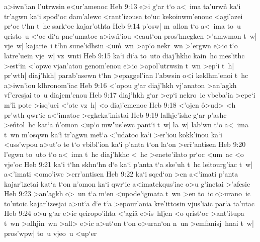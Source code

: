 a>iwn'ian
l'utrwsin
e<ur'amenoc\bibvsend
\vs Heb 9:13
e>i
g`ar
t`o
a<~ima
ta'urwn\r{}
ka`i
tr'agwn
ka`i
spod`oc
dam'alewc
<rant'izousa
to`uc
kekoinwm'enouc
<agi'azei
pr`oc
t`hn
t~hc
sark`oc
kajar'othta\bibvsend
\vs Heb 9:14
p'osw|
m~allon
t`o
a<~ima
to~u
qristo~u
<`oc
di`a
pne'umatoc
a>iw\r{n}'iou
<eaut`on
pros'hnegken
>'amwmon
t~w|
vje~w|
kajarie~i
t`hn
sune'idhsin
<u\r{m}~wn
>ap`o
nekr~wn
>'ergwn
e>ic
t`o
latre'uein
vje~w|
vz~wnti\bibvsend
\vs Heb 9:15
ka`i
di`a
to~uto
diaj'hkhc
kain~hc
mes'ithc
>est`in
<'opwc
vjan'atou
genom'enou
e>ic
>apol'utrwsin
t~wn
>ep`i
t~h|
pr'wth|
diaj'hkh|
parab'asewn
t`hn
>epaggel'ian
l'abwsin
o<i
keklhm'enoi
t~hc
a>iwn'iou
klhronom'iac\bibvsend
\vs Heb 9:16
<'opou
g`ar
diaj'hkh
vj'anaton
>an'agkh
vf'eresjai
to~u
diajem'enou\bibvsend
\vs Heb 9:17
diaj'hkh
g`ar
>ep`i
nekro~ic
vbeba'ia
>epe`i
m'h\r{}
pote
>isq'uei
<'ote
vz~h|
<o
diaj'emenoc\bibvsend
\vs Heb 9:18
<'ojen
\r{o}>ud>
<h
pr'wth
qwr`ic
a<'imatoc
>egkeka'inistai\bibvsend
\vs Heb 9:19
lalhje'ishc
g`ar
p'ashc
>e\r{n}tol~hc
kat`a
\r{n}'omon
<up`o
mw"us'ewc
pant`i
t~w|
la~w|
lab`wn
t`o
a<~ima
t~wn
m'osqwn
ka`i\r{}
tr'agwn
me\r{t}`a
<'udatoc
ka`i
>er'iou
kokk'inou
ka`i
<uss'wpou
a>ut'o
te
t`o
vbibl'ion
ka`i
p'anta
t`on
la`on
>er\r{r}'antisen\bibvsend
{}
\vs Heb 9:20
l'egwn
to~uto
t`o
a<~ima
t~hc
diaj'hkhc
<~hc
>enete'ilato
pr`oc
<um~ac
<o
vje'oc\bibvsend
\vs Heb 9:21
ka`i
t`hn
skhn`hn
d`e
ka`i
p'anta
t`a
ske'uh
t~hc
leitourg'iac
t~w|
a<'imati
<omo'iwc
>err'antisen\bibvsend
{}
\vs Heb 9:22
ka`i
sqed`on
>en
a<'imati
p'anta
kajar'izetai
kat`a
t`on
n'omon
ka`i
qwr`ic
a<imatekqus'iac
o>u
g'inetai
>'afesic\bibvsend
\vs Heb 9:23
>an'agkh
o>~un
t`a
m`en
<upode'igmata
t~wn
>en
to~ic
o>urano~ic
to'utoic
kajar'izesjai
a>ut`a
d`e
t`a
>epour'ania
kre'ittosin
vjus'iaic
par`a
ta'utac\bibvsend
\vs Heb 9:24
o>u
g`ar
e>ic
qeiropo'ihta
<'agia\r{}
e>is~hljen
<o
qrist`oc
>ant'itupa
t~wn
>alhjin~wn
>all>
e>ic
a>ut`on
t`on
o>uran`on
n~un
>emfanisj~hnai
t~w|
pros'wpw|
to~u
vjeo~u
<up`er
